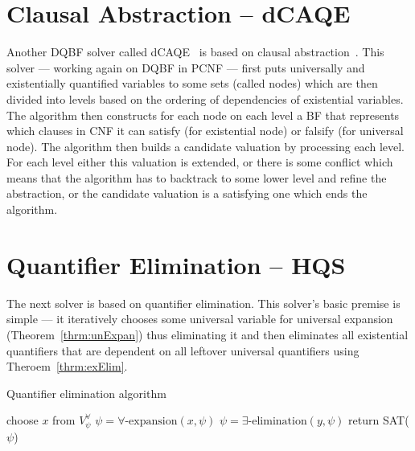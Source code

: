 \documentclass[
  digital, %
  color,
  twoside, %
  table,   %
  nolof,     %
  nolot,     %
]{fithesis3}
\theoremstyle{definition}
\theoremstyle{remark}
\newcommand{\evars}[1]{V_{#1}^{\exists}}
\newcommand{\uvars}[1]{V_{#1}^{\forall}}
\begin{document}
\section{Clausal Abstraction -- dCAQE}
Another DQBF solver called dCAQE~\cite{dCAQE} is based on clausal abstraction~\cite{ClausalAbstr}. This solver --- working again on DQBF in PCNF --- first puts universally and existentially quantified variables to some sets (called nodes) which are then divided into levels based on the ordering of dependencies of existential variables. The algorithm then constructs for each node on each level a BF that represents which clauses in CNF it can satisfy (for existential node) or falsify (for universal node). The algorithm then builds a candidate valuation by processing each level. For each level either this valuation is extended, or there is some conflict which means that the algorithm has to backtrack to some lower level and refine the abstraction, or the candidate valuation is a satisfying one which ends the algorithm.

\section{Quantifier Elimination -- HQS}
The next solver is based on quantifier elimination. This solver's basic premise is simple --- it iteratively chooses some universal variable for universal expansion (Theorem~\ref{thrm:unExpan}) thus eliminating it and then eliminates all existential quantifiers that are dependent on all leftover universal quantifiers using Theroem~\ref{thrm:exElim}.

\begin{algorithm}
\caption{Quantifier elimination algorithm}
\label{alg:QE}
\begin{algorithmic}[1]
\While{$\uvars{\psi}$ is not empty}%
    \State choose $x$ from $\uvars{\psi}$
    \State $\psi = \forall\text{-expansion}(x,\psi)$ %
    \ForAll{$y \in \evars{\psi}$ s. t. $D_y = \uvars{\psi}$} %
        \State $\psi = \exists\text{-elimination}(y,\psi)$ %
    \EndFor
\EndWhile
\State return SAT($\psi$)
\EndFunction
\end{algorithmic}
\end{algorithm}
\end{document}
